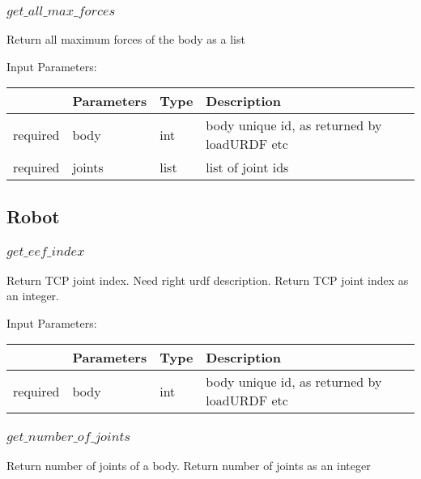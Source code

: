 \documentclass[
	ngerman,
	accentcolor=9c,%
	type=intern,
	marginpar=false
	]{tudapub}
\begin{document}
\subsubsection{$get\_all\_max\_forces$}
\noindent Return all maximum forces of the body  as a list


\vspace{0.5cm}
\noindent Input Parameters:
\vspace{0.5cm}

\begin{tabular}{|p{}|p{}|p{}| p{}|}
\hline
 & \textbf{Parameters} & \textbf{Type} & \textbf{Description} \\
\hline
required & body & int & body unique id, as returned by loadURDF etc\\
\hline
required & joints & list & list of joint ids\\
\hline
\end{tabular}
\vspace{0.5cm}



\subsection{Robot}
\subsubsection{$get\_eef\_index$}
\noindent Return TCP joint index. Need right urdf description. Return TCP joint index as an integer.



\vspace{0.5cm}
\noindent Input Parameters:
\vspace{0.5cm}

\begin{tabular}{|p{}|p{}|p{}| p{}|}
\hline
 & \textbf{Parameters} & \textbf{Type} & \textbf{Description} \\
\hline
required & body & int & body unique id, as returned by loadURDF etc\\
\hline
\end{tabular}
\vspace{0.5cm}



\subsubsection{$get\_number\_of\_joints$}
\noindent Return number of joints of a body. Return number of joints as an integer
\end{document}
